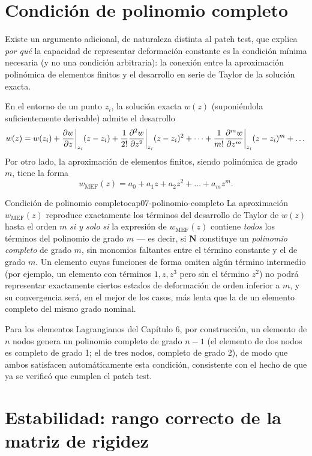 \section{Condición de polinomio completo}

Existe un argumento adicional, de naturaleza distinta al patch test, que explica \emph{por qué} la capacidad de representar deformación constante es la condición mínima necesaria (y no una condición arbitraria): la conexión entre la aproximación polinómica de elementos finitos y el desarrollo en serie de Taylor de la solución exacta.

En el entorno de un punto $z_i$, la solución exacta $w(z)$ (suponiéndola suficientemente derivable) admite el desarrollo
\[
w(z) = w(z_i) + \pdv{w}{z}\bigg|_{z_i}(z-z_i) + \frac{1}{2!}\pdv[2]{w}{z}\bigg|_{z_i}(z-z_i)^2 + \dots + \frac{1}{m!}\pdv[m]{w}{z}\bigg|_{z_i}(z-z_i)^m + \dots
\]
Por otro lado, la aproximación de elementos finitos, siendo polinómica de grado $m$, tiene la forma
\[
w_{\text{MEF}}(z) = a_0 + a_1 z + a_2 z^2 + \dots + a_m z^m .
\]

\begin{ecnimportante}{Condición de polinomio completo}{cap07-polinomio-completo}
La aproximación $w_{\text{MEF}}(z)$ reproduce exactamente los términos del desarrollo de Taylor de $w(z)$ hasta el orden $m$ \emph{si y solo si} la expresión de $w_{\text{MEF}}(z)$ contiene \emph{todos} los términos del polinomio de grado $m$ --- es decir, si $\bm N$ constituye un \emph{polinomio completo} de grado $m$, sin monomios faltantes entre el término constante y el de grado $m$. Un elemento cuyas funciones de forma omiten algún término intermedio (por ejemplo, un elemento con términos $1, z, z^3$ pero sin el término $z^2$) no podrá representar exactamente ciertos estados de deformación de orden inferior a $m$, y su convergencia será, en el mejor de los casos, más lenta que la de un elemento completo del mismo grado nominal.
\end{ecnimportante}

Para los elementos Lagrangianos del Capítulo 6, por construcción, un elemento de $n$ nodos genera un polinomio completo de grado $n-1$ (el elemento de dos nodos es completo de grado 1; el de tres nodos, completo de grado 2), de modo que ambos satisfacen automáticamente esta condición, consistente con el hecho de que ya se verificó que cumplen el patch test.

\section{Estabilidad: rango correcto de la matriz de rigidez}

